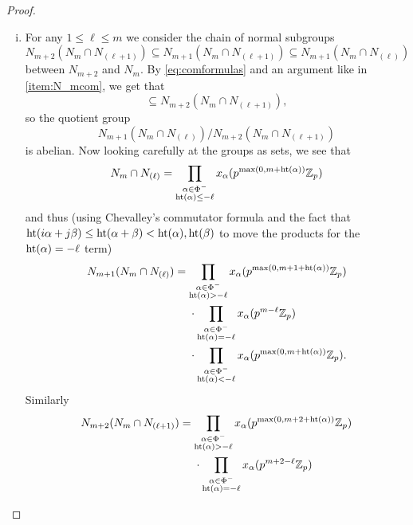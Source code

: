 \begin{proof}
\begin{enumerate}[(i),wide]
  \item For any $1 \leq \ell \leq m$ we consider the chain of normal subgroups
    \begin{equation*}
      N_{m+2}(N_m \cap N_{(\ell+1)}) \subseteq N_{m+1}(N_m \cap N_{(\ell+1)}) \subseteq N_{m+1}(N_m \cap N_{(\ell)})
    \end{equation*}
    between $N_{m+2}$ and $N_m$. By \eqref{eq:comformulas} and an argument like in \ref{item:N_mcom}, we get that
    \begin{equation*}
      [N_{m+1}(N_m \cap N_{(\ell)}),N_{m+1}(N_m \cap N_{(\ell)})] \subseteq N_{m+2}(N_m \cap N_{(\ell+1)}),
    \end{equation*}
    so the quotient group
    \begin{equation*}
      N_{m+1}(N_m \cap N_{(\ell)}) / N_{m+2}(N_m \cap N_{(\ell+1)})
    \end{equation*}
    is abelian. Now looking carefully at the groups as sets, we see that
    \begin{equation*}
      N_{m} \cap N_{(\ell)} = \prod_{\substack{\alpha \in \Phi^{-} \\ \operatorname{ht}(\alpha) \leq -\ell}} x_\alpha(p^{\max(0,m+\operatorname{ht}(\alpha))} \mathbb{Z}_p)
    \end{equation*}
    and thus (using Chevalley's commutator formula and the fact that $\operatorname{ht}(i\alpha+j\beta) \leq \operatorname{ht}(\alpha+\beta) < \operatorname{ht}(\alpha), \operatorname{ht}(\beta)$ to move the products for the $\operatorname{ht}(\alpha) = -\ell$ term)
    \begin{align*}
      N_{m+1}(N_{m} \cap N_{(\ell)}) &= \prod_{\substack{\alpha \in \Phi^{-} \\ \Ht(\alpha) > -\ell}} x_\alpha(p^{\max(0,m+1+\Ht(\alpha))} \Z_p) \\
      &\phantom{{}={}} \cdot \prod_{\substack{\alpha \in \Phi^{-} \\ \Ht(\alpha) = -\ell}} x_\alpha(p^{m-\ell} \Z_p) \\
      &\phantom{{}={}} \cdot \prod_{\substack{\alpha \in \Phi^{-} \\ \Ht(\alpha) < -\ell}} x_\alpha(p^{\max(0,m+\Ht(\alpha))} \Z_p).
    \end{align*}
    Similarly
    \begin{align*}
      N_{m+2}(N_{m} \cap N_{(\ell+1)}) &= \prod_{\substack{\alpha \in \Phi^{-} \\ \Ht(\alpha) > -\ell}} x_\alpha(p^{\max(0,m+2+\Ht(\alpha))} \Z_p) \\
      &\phantom{{}={}} \cdot \prod_{\substack{\alpha \in \Phi^{-} \\ \Ht(\alpha) = -\ell}} x_\alpha(p^{m+2-\ell} \Z_p) \\

\end{align*}
\end{enumerate}
\end{proof}
